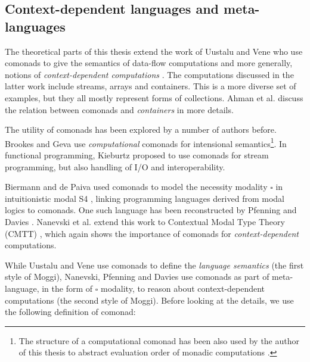  
\subsection{Context-dependent languages and meta-languages}
\label{sec:path-sem-contextdep}

The theoretical parts of this thesis extend the work of Uustalu and Vene who use comonads
to give the semantics of data-flow computations \cite{comonads-dataflow} and more generally, 
notions of \emph{context-dependent computations} \cite{comonads-notions}. The computations discussed 
in the latter work include streams, arrays and containers. This is a more diverse set of examples, 
but they all mostly represent forms of collections. Ahman et al. \cite{comonads-containers} discuss
the relation between comonads and \emph{containers} \cite{types-containers} in more details.

The utility of comonads has been explored by a number of authors before. Brookes and Geva
\cite{comonads-computational} use \emph{computational} comonads for intensional semantics\footnote{The
structure of a computational comonad has been also used by the author of this thesis to abstract
evaluation order of monadic computations \cite{comonads-malias}.}. In functional programming,
Kieburtz \cite{comonads-and-codata} proposed to use comonads for stream programming, but also 
handling of I/O and interoperability.

Biermann and de Paiva used comonads to model the necessity modality $\square$ in intuitionistic
modal S4 \cite{logic-intuitionistic-modal}, linking programming languages derived from modal
logics to comonads. One such language has been reconstructed by Pfenning and Davies
\cite{logic-modal-reconstruction}. Nanevski et al. extend this work to Contextual Modal Type 
Theory (CMTT) \cite{logic-cmtt}, which again shows the importance of comonads for 
\emph{context-dependent} computations.

While Uustalu and Vene use comonads to define the \emph{language semantics} (the first style
of Moggi), Nanevski, Pfenning and Davies use comonads as part of meta-language, in the form 
of $\square$ modality, to reason about context-dependent computations (the second style of 
Moggi). Before looking at the details, we use the following definition of comonad:

